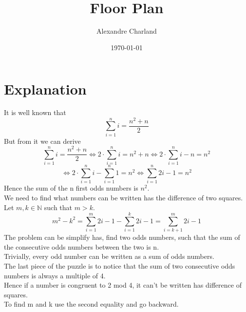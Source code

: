 \documentclass{article}
\title{Floor Plan}
\author{Alexandre Charland}
\date{\today}
\begin{document}
\maketitle

\section{Explanation}
It is well known that
\[ \sum_{i=1}^{n} i = \frac{n^{2}+n}{2} \]
But from it we can derive
\[ \sum_{i=1}^{n} i = \frac{n^{2}+n}{2} \iff 2 \cdot \sum_{i=1}^{n} i = n^{2} +n \iff 2 \cdot \sum_{i=1}^{n} i - n= n^{2} \]
\[ \iff 2 \cdot \sum_{i=1}^{n} i - \sum_{i=1}^n 1 = n^{2} \iff \sum_{i=1}^n 2i-1 = n^2 \]
Hence the sum of the n first odds numbers is $n^2$.\\
We need to find what numbers can be written has the difference of two squares. Let $m , k \in \mathbb{N}$ such that $m>k$.
\[ m^2 - k^2 = \sum_{i=1}^m 2i-1 - \sum_{i=1}^k 2i-1 = \sum_{i=k+1}^m 2i-1 \]
The problem can be simplify has, find two odds numbers, such that the sum of the consecutive odds numbers between the two is n.\\
Trivially, every odd number can be written as a sum of odds numbers.\\
The last piece of the puzzle is to notice that the sum of two consecutive odds numbers is always a multiple of 4.\\
Hence if a number is congruent to 2 mod 4, it can't be written has difference of squares.\\
To find m and k use the second equality and go backward.
\end{document}
